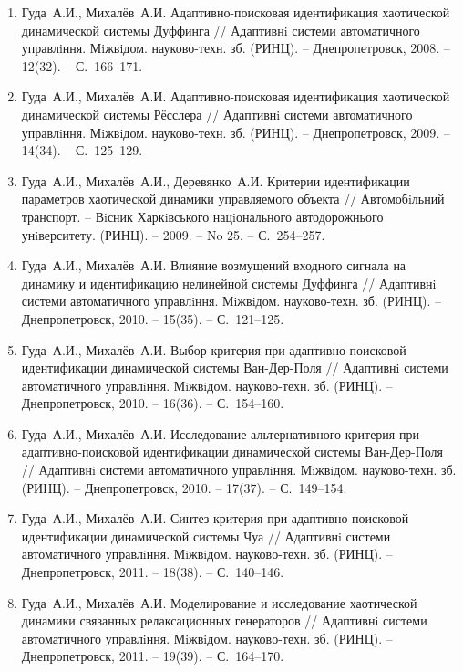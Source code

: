 \begin{enumerate}

\item
Гуда~А.И., Михалёв~А.И. Адаптивно-поисковая идентификация хаотической динамической
системы Дуффинга // Адаптивнi системи автоматичного управлiння.
Мiжвiдом. науково-техн. зб. (РИНЦ). -- Днепропетровск, 2008. -- 12(32). -- С.~166--171.

\item
Гуда~А.И., Михалёв~А.И. Адаптивно-поисковая идентификация хаотической
динамической системы Рёсслера // Адаптивнi системи автоматичного управлiння. Мiжвiдом.
науково-техн. зб. (РИНЦ). -- Днепропетровск, 2009. -- 14(34). -- С.~125--129.

\item
Гуда~А.И., Михалёв~А.И., Деревянко~А.И. Критерии идентификации параметров
хаотической динамики управляемого объекта // Автомобiльний транспорт. --
Вiсник Харкiвського нацiонального автодорожнього унiверситету. (РИНЦ). -- 2009. -- No 25. -- С.~254--257.

\item
Гуда~А.И., Михалёв~А.И. Влияние возмущений входного сигнала на динамику и
идентификацию нелинейной системы Дуффинга // Адаптивнi системи автоматичного управлiння.
Мiжвiдом. науково-техн. зб. (РИНЦ). -- Днепропетровск, 2010. -- 15(35). -- С.~121--125.

\item
Гуда~А.И., Михалёв~А.И. Выбор критерия при адаптивно-поисковой идентификации
динамической системы Ван-Дер-Поля // Адаптивнi системи автоматичного управлiння.
Мiжвiдом. науково-техн. зб. (РИНЦ). -- Днепропетровск, 2010. -- 16(36). -- С.~154--160.

\item
Гуда~А.И., Михалёв~А.И. Исследование альтернативного критерия при адаптивно-поисковой
идентификации динамической системы Ван-Дер-Поля
// Адаптивнi системи автоматичного управлiння. Мiжвiдом. науково-техн. зб. (РИНЦ).
-- Днепропетровск, 2010. -- 17(37). -- С.~149--154.

\item
Гуда~А.И., Михалёв~А.И. Синтез критерия при адаптивно-поисковой идентификации
динамической системы Чуа // Адаптивнi системи автоматичного управлiння.
Мiжвiдом. науково-техн. зб. (РИНЦ). -- Днепропетровск, 2011. -- 18(38). -- С.~140--146.

\item
Гуда~А.И., Михалёв~А.И. Моделирование и исследование хаотической динамики
связанных релаксационных генераторов // Адаптивнi системи автоматичного управлiння.
Мiжвiдом. науково-техн. зб. (РИНЦ). -- Днепропетровск, 2011. -- 19(39). -- С.~164--170.


\end{enumerate}
